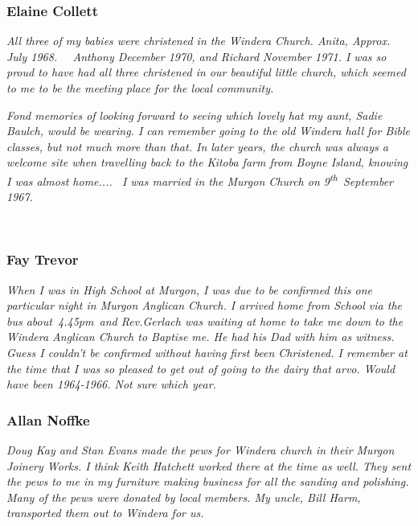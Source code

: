 \subsubsection{Elaine Collett}



\emph{All three of my babies were christened in the Windera Church. Anita, Approx. July 1968.~~ Anthony December 1970, and Richard November 1971. I was so proud to have had all three christened in our beautiful little church, which seemed to me to be the meeting place for the local community.}



\emph{Fond memories of looking forward to seeing which lovely hat my aunt, Sadie Baulch, would be wearing. I can remember going to the old Windera hall for Bible classes, but not much more than that. In later years, the church was always a welcome site when travelling back to the Kitoba farm from Boyne Island, knowing I was almost home.... ~I was married in the Murgon Church on 9\textsuperscript{th}~September 1967.}



~



\subsubsection{Fay Trevor}



\emph{When I was in High School at Murgon, I was due to be confirmed this one particular night in Murgon Anglican Church. I arrived home from School via the bus about~4.45pm~and Rev.Gerlach was waiting at home to take me down to the Windera Anglican Church to Baptise me. He had his Dad with him as witness. Guess I couldn't be confirmed without having first been Christened. I remember at the time that I was so pleased to get out of going to the dairy that arvo. Would have been 1964-1966. Not sure which year.}



\subsubsection{Allan Noffke}



\emph{Doug Kay and Stan Evans made the pews for Windera church in their Murgon Joinery Works. I think Keith Hatchett worked there at the time as well. They sent the pews to me in my furniture making business for all the sanding and polishing. Many of the pews were donated by local members. My uncle, Bill Harm, transported them out to Windera for us.}



